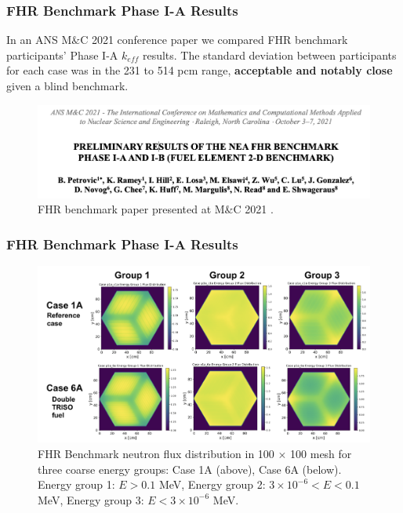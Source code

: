 \begin{frame}
    \frametitle{FHR Benchmark Phase I-A Results}
    In an ANS M$\&$C 2021 conference paper we compared FHR benchmark participants' 
    Phase I-A $k_{eff}$ results. 
    The standard deviation between participants for each case was in the 231 to 514 
    pcm range, \textbf{acceptable and notably close} given a blind benchmark.

    \begin{figure}[]
        \centering
        \includegraphics[width=0.85\linewidth]{figures/mnc.png} 
        \caption{FHR benchmark paper presented at M$\&$C 2021 
        \cite{petrovic_preliminary_2021}.}
    \end{figure}
\end{frame}

\begin{frame}
    \frametitle{FHR Benchmark Phase I-A Results}
    \begin{figure}
        \centering
        \includegraphics[width=\linewidth]{figures/phase1a-flux.png} 
        \vspace{-0.2cm}
        \caption{FHR Benchmark neutron flux 
        distribution in 100 $\times$ 100 mesh for three coarse energy groups: Case 
        1A (above), Case 6A (below). Energy group 1: $E > 0.1$ MeV, 
        Energy group 2: $3 \times 10^{-6} < E < 0.1$ MeV, Energy group 3: $E < 3 \times 10^{-6}$ MeV. }
    \end{figure}
\end{frame}

